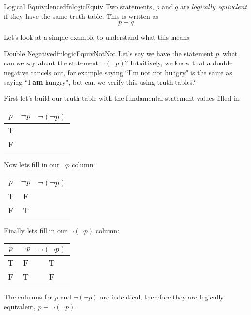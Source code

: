 \begin{dfn}[label={def:logicalEquivalence}]{Logical Equivalence}{dfnlogicEquiv}
    Two statements, $p$ and $q$ are \emph{logically equivalent} if they have the same truth table. This is written as $$ p \equiv q$$
\end{dfn}

Let's look at a simple example to understand what this means

\begin{exmpl}[label={exmpl:logicEquivNotNot}]{Double Negative}{dfnlogicEquivNotNot}
    Let's say we have the statement $p$, what can we say about the statement $\lnot (\lnot p)$? Intuitively, we know that a double negative cancels out, for example saying ``I'm not not hungry" is the same as saying ``I \textbf{am} hungry", but can we verify this using truth tables?

    First let's build our truth table with the fundamental statement values filled in:
    \begin{center}
        \begin{tabular}{|c|c|c|}
            \hline
            $p$ & $\lnot p$ & $\lnot (\lnot p)$ \\
            \hline
            T   &           &                   \\
            \hline
            F   &           &                   \\
            \hline
        \end{tabular}
    \end{center}
    \vspace{0.5cm}
    Now lets fill in our $\lnot p$ column:
    \begin{center}
        \begin{tabular}{|c|c|c|}
            \hline
            $p$ & $\lnot p$ & $\lnot (\lnot p)$ \\
            \hline
            T   & F         &                   \\
            \hline
            F   & T         &                   \\
            \hline
        \end{tabular}
    \end{center}
    \vspace{0.5cm}
    Finally lets fill in our $\lnot (\lnot p)$ column:
    \begin{center}
        \begin{tabular}{|c|c|c|}
            \hline
            $p$ & $\lnot p$ & $\lnot (\lnot p)$ \\
            \hline
            T   & F         & T                 \\
            \hline
            F   & T         & F                 \\
            \hline
        \end{tabular}
    \end{center}
    \vspace{0.5cm}
    The columns for $p$ and $\lnot(\lnot p)$ are indentical, therefore they are logically equivalent, $p \equiv \lnot(\lnot p)$.
\end{exmpl}

